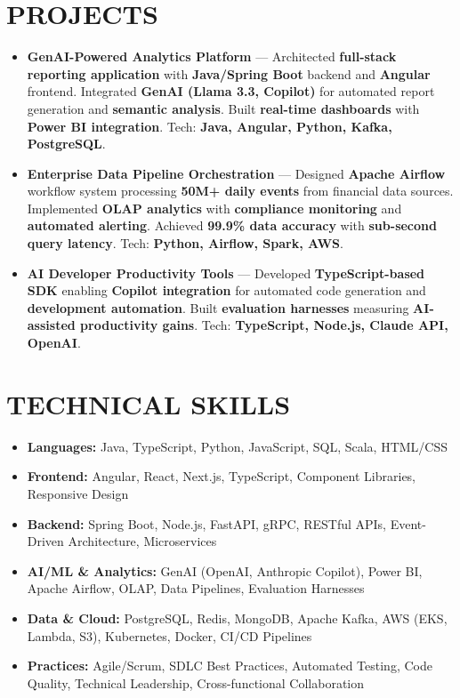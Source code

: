 \documentclass[letterpaper,10pt]{article}
\newcommand{\resumeItem}[1]{\item\small #1}
\begin{document}
\section{\textcolor{metablue}{PROJECTS}}
\vspace{-6pt}
\begin{tcolorbox}[colback=white,colframe=metablue,boxrule=0.8pt,arc=2pt,left=4pt,right=4pt,top=2pt,bottom=2pt,before skip=0pt,after skip=0pt]
\begin{itemize}[topsep=0pt,partopsep=0pt]
\resumeItem{\textbf{GenAI-Powered Analytics Platform} --- Architected \textbf{full-stack reporting application} with \textbf{Java/Spring Boot} backend and \textbf{Angular} frontend. Integrated \textbf{GenAI (Llama 3.3, Copilot)} for automated report generation and \textbf{semantic analysis}. Built \textbf{real-time dashboards} with \textbf{Power BI integration}. Tech: \textbf{Java, Angular, Python, Kafka, PostgreSQL}.}
\resumeItem{\textbf{Enterprise Data Pipeline Orchestration} --- Designed \textbf{Apache Airflow} workflow system processing \textbf{50M+ daily events} from financial data sources. Implemented \textbf{OLAP analytics} with \textbf{compliance monitoring} and \textbf{automated alerting}. Achieved \textbf{99.9\% data accuracy} with \textbf{sub-second query latency}. Tech: \textbf{Python, Airflow, Spark, AWS}.}
\resumeItem{\textbf{AI Developer Productivity Tools} --- Developed \textbf{TypeScript-based SDK} enabling \textbf{Copilot integration} for automated code generation and \textbf{development automation}. Built \textbf{evaluation harnesses} measuring \textbf{AI-assisted productivity gains}. Tech: \textbf{TypeScript, Node.js, Claude API, OpenAI}.}
\end{itemize}
\end{tcolorbox}
\vspace{-5pt}

\section{\textcolor{metablue}{TECHNICAL SKILLS}}
\vspace{-5pt}
\small
\begin{itemize}
\resumeItem{\textbf{Languages:} Java, TypeScript, Python, JavaScript, SQL, Scala, HTML/CSS}
\resumeItem{\textbf{Frontend:} Angular, React, Next.js, TypeScript, Component Libraries, Responsive Design}
\resumeItem{\textbf{Backend:} Spring Boot, Node.js, FastAPI, gRPC, RESTful APIs, Event-Driven Architecture, Microservices}
\resumeItem{\textbf{AI/ML \& Analytics:} GenAI (OpenAI, Anthropic Copilot), Power BI, Apache Airflow, OLAP, Data Pipelines, Evaluation Harnesses}
\resumeItem{\textbf{Data \& Cloud:} PostgreSQL, Redis, MongoDB, Apache Kafka, AWS (EKS, Lambda, S3), Kubernetes, Docker, CI/CD Pipelines}
\resumeItem{\textbf{Practices:} Agile/Scrum, SDLC Best Practices, Automated Testing, Code Quality, Technical Leadership, Cross-functional Collaboration}
\end{itemize}
\vspace{-10pt}
\end{document}
